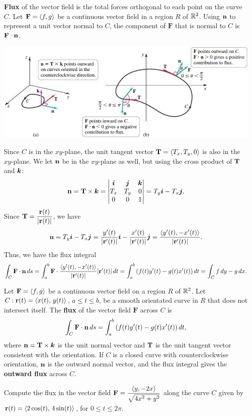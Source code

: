 \documentclass[mathNotesPreamble]{subfiles}
\begin{document}
  \textbf{Flux} of the vector field is the total forces orthogonal to each point on the curve $C$. Let $\mathbf F={\left\langle f,g \right\rangle}$ be a continuous vector field in a region $R$ of $\mathbb{R}^2$. Using ${\mathbf{n}}$ to represent a unit vector normal to $C$, the component of $\mathbf F$ that is normal to $C$ is $\mathbf F\cdot{\mathbf{n}}$. 
  \begin{center}
    \includegraphics[width=0.95\linewidth]{images/briggs_17_02/fig17_26}
  \end{center}

  Since $C$ is in the $xy$-plane, the unit tangent vector ${\mathbf{T}}={\left\langle T_x,T_y,0 \right\rangle}$ is also in the $xy$-plane. We let ${\mathbf{n}}$ be in the $xy$-plane as well, but using the cross product of ${\mathbf{T}}$ and ${\bm{k}}$:
  \begin{align*}
    {\mathbf{n}}={\mathbf{T}}\times{\bm{k}}=
    \begin{vmatrix}
      {\bm{i}}& {\bm{j}}& {\bm{k}}\\
      T_x& T_y& 0\\
      0& 0& 1
    \end{vmatrix}
    = T_y{\bm{i}}-T_x{\bm{j}}.
  \end{align*}
  Since ${\mathbf{T}}=\dfrac{{\mathbf{r}}(t)}{{\left\vert{\mathbf{r}}(t)\right\vert}}$, we have 
    \[{\mathbf{n}}=T_y{\bm{i}}-T_x{\bm{j}}=\frac{y'(t)}{{\left\vert{\mathbf{r}}'(t)\right\vert}}{\bm{i}}-\frac{x'(t)}{{\left\vert{\mathbf{r}}'(t)\right\vert}}{\bm{j}}=\frac{{\left\langle y'(t),-x'(t) \right\rangle}}{{\left\vert{\mathbf{r}}'(t)\right\vert}}.\]
  Thus, we have the flux integral
    \[\int_C \mathbf F\cdot{\mathbf{n}}\,ds =\int_a^b \mathbf F\cdot \frac{{\left\langle y'(t),-x'(t) \right\rangle}}{{\left\vert{\mathbf{r}}'(t)\right\vert}} {\left\vert{\mathbf{r}}'(t)\right\vert}\,dt=\int_a^b {\left(f(t)y'(t)-g(t)x'(t)\right)}\,dt=\int_C f\,dy-g\,dx.\]
  \pagebreak

  \begin{defn*}[Flux]
    Let $\mathbf F={\left\langle f,g \right\rangle}$ be a continuous vector field on a region $R$ of $\mathbb{R}^2$. Let $C: {\mathbf{r}}(t)={\left\langle x(t),\,y(t) \right\rangle}$, $a\leq t\leq b$, be a smooth orientated curve in $R$ that does not intersect itself. The \textbf{flux} of the vector field $\mathbf F$ across $C$ is
      \[\int_C \mathbf F\cdot {\mathbf{n}}\,ds=\int_a^b {\left(f(t)y'(t)-g(t)x'(t)\right)}\,dt,\]
    where ${\mathbf{n}}={\mathbf{T}}\times{\bm{k}}$ is the unit normal vector and ${\mathbf{T}}$ is the unit tangent vector consistent with the orientation. If $C$ is a closed curve with counterclockwise orientation, ${\mathbf{n}}$ is the outward normal vector, and the flux integral gives the \textbf{outward flux} across $C$.
  \end{defn*}

  \begin{ex*}
    Compute the flux in the vector field $\mathbf F=\dfrac{{\left\langle y,-2x \right\rangle}}{\sqrt{4x^2+y^2}}$ along the curve $C$ given by ${\mathbf{r}}(t)={\left\langle 2\cos(t),\,4\sin(t) \right\rangle}$, for $0\leq t\leq 2\pi$.
  \end{ex*}
  \pagebreak
  
\end{document}
